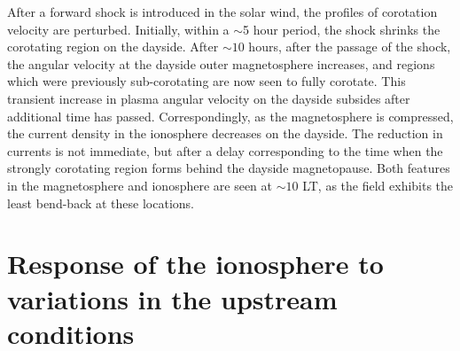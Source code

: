 After a forward shock is introduced in the solar wind, the profiles of corotation velocity are perturbed. Initially, within a $\sim$5 hour period, the shock shrinks the corotating region on the dayside. After $\sim10$ hours, after the passage of the shock, the angular velocity at the dayside outer magnetosphere increases, and regions which were previously sub-corotating are now seen to fully corotate. This transient increase in plasma angular velocity on the dayside subsides after additional time has passed. Correspondingly, as the magnetosphere is compressed, the current density in the ionosphere decreases on the dayside. The reduction in currents is not immediate, but after a delay corresponding to the time  when the strongly corotating region forms behind the dayside magnetopause. Both features in the magnetosphere and ionosphere are seen at $\sim10$ LT, as the field exhibits the least bend-back at these locations. 

\section{Response of the ionosphere to variations in the upstream conditions}

